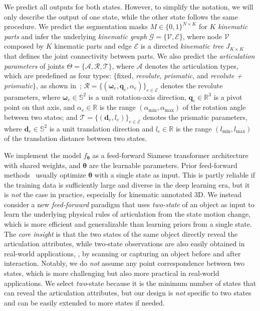 We predict all outputs for both states.
However, to simplify the notation, we will only describe the output of one state, while the other state follows the same procedure.
We predict the segmentation masks $M \in \{0,1\}^{N \times K}$ for $K$ \emph{kinematic parts}
and infer the underlying \emph{kinematic graph}
$\mathcal{G} = \{\mathcal{V}, \mathcal{E}\}$,
where
node $\mathcal{V}$ composed by $K$ kinematic parts and
edge $\mathcal{E}$ is a directed \emph{kinematic tree}
$J_{K \times K}$
that defines the joint connectivity between parts.
We also predict the \emph{articulation parameters} of joints $\Theta=\{\mathcal{A}, \mathcal{R}, \mathcal{T}\}$,
where
$\mathcal{A}$ denotes the articulation types,
which are predefined as four types:
$\{$fixed, \emph{revolute}, \emph{prismatic}, and \emph{revolute + prismatic}$\}$, as shown in~;
$\mathcal{R} = \{(\bm{\omega}_e, \bm{q}_e, \alpha_e)\}_{e \in \mathcal{E}}$ denotes the revolute parameters, where $\bm{\omega}_e \in \mathbb{S}^2$ is a unit rotation-axis direction, $\bm{q}_e \in \mathbb{R}^3$ is a pivot point on that axis, and $\alpha_e \in \mathbb{R}$ is the range
$(\alpha_{\min}, \alpha_{\max})$
of the rotation angle between two states;
and $\mathcal{T} = \{(\bm{d}_e, l_e)\}_{e \in \mathcal{E}}$ denotes the prismatic parameters,
where $\bm{d}_e \in \mathbb{S}^2$ is a unit translation direction and $l_e \in \mathbb{R}$ is the range
$(l_{\min}, l_{\max})$
of the translation distance between two states.

We implement the model
$f_{\bm{\theta}}$
as a feed-forward Siamese transformer architecture
with shared weights,
and $\bm{\theta}$ are the learnable parameters.
Prior feed-forward methods~\cite{chen2024urdformer,chen2025ArtiLatent,che2024op,Goyal_2025_ICCV,li2025particulate} usually optimize $\bm{\theta}$ with a single state as input.
This is partly reliable if the training data is sufficiently large and diverse in the deep learning era, but it is \emph{not} the case in practice, especially for kinematic annotated 3D.
We instead consider a new \emph{feed-forward} paradigm that uses \emph{two-state} of an object as input to learn the underlying physical rules of articulation from the state motion change,
which is more efficient and generalizable than learning priors from a single state.
The \emph{core insight} is that the two states of the same object directly reveal the articulation attributes,
while two-state observations are also easily obtained in real-world applications, \eg, by scanning or capturing an object before and after interaction.
Notably, we do \emph{not} assume any point correspondence between two states,
which is more challenging but also more practical in real-world applications.
We select \emph{two}-state because it is the minimum number of states that can reveal the articulation attributes,
but our design is \emph{not} specific to two states and can be easily extended to more states if needed.

